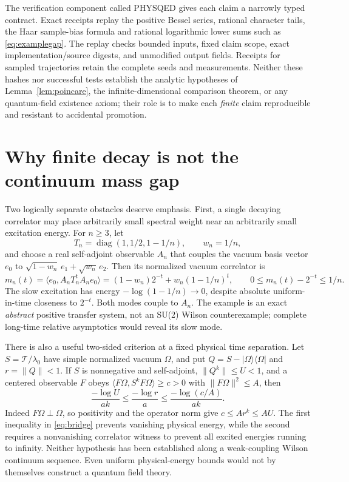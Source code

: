 \documentclass[11pt,a4paper]{article}
\numberwithin{equation}{section}
\begin{document}
The verification component called PHYSQED gives each
claim a narrowly typed contract. Exact receipts replay
the positive Bessel series, rational character tails,
the Haar sample-bias formula and rational logarithmic
lower sums such as \eqref{eq:examplegap}. The replay
checks bounded inputs, fixed claim scope, exact
implementation/source digests, and unmodified output
fields. Receipts for sampled trajectories retain the
complete seeds and measurements. Neither these hashes
nor successful tests establish the analytic hypotheses
of Lemma~\ref{lem:poincare}, the infinite-dimensional
comparison theorem, or any quantum-field existence
axiom; their role is to make each \emph{finite} claim
reproducible and resistant to accidental promotion.

\section{Why finite decay is not the continuum mass gap}
\label{sec:limits}

Two logically separate obstacles deserve emphasis.
First, a single decaying correlator may place
arbitrarily small spectral weight near an arbitrarily
small excitation energy. For \(n\geq3\), let
\[
 T_n=\operatorname{diag}(1,1/2,1-1/n),\qquad
 w_n=1/n,
\]
and choose a real self-adjoint observable \(A_n\)
that couples the vacuum basis vector \(e_0\) to
\(\sqrt{1-w_n}\,e_1+\sqrt{w_n}\,e_2\).
Then its normalized vacuum correlator is
\begin{equation}
 m_n(t)=\langle e_0,A_nT_n^tA_ne_0\rangle
   =(1-w_n)2^{-t}+w_n(1-1/n)^t, \qquad
 0\leq m_n(t)-2^{-t}\leq1/n.                    \label{eq:counter}
\end{equation}
The slow excitation has energy
\(-\log(1-1/n)\to0\), despite absolute
uniform-in-time closeness to \(2^{-t}\).
Both modes couple to \(A_n\). The example is
an exact \emph{abstract} positive transfer system,
not an SU(2) Wilson counterexample; complete
long-time relative asymptotics would reveal its
slow mode.

There is also a useful two-sided criterion at a fixed
physical time separation. Let \(S=\mathcal T/\lambda_0\)
have simple normalized vacuum \(\Omega\), and put
\(Q=S-|\Omega\rangle\langle\Omega|\) and
\(r=\|Q\|<1\). If \(S\) is nonnegative and
self-adjoint, \(\|Q^k\|\leq U<1\), and a centered
observable \(F\) obeys
\(\langle F\Omega,S^kF\Omega\rangle\geq c>0\)
with \(\|F\Omega\|^2\leq A\), then
\begin{equation}
 \frac{-\log U}{ak}\leq\frac{-\log r}{a}
              \leq\frac{-\log(c/A)}{ak}.       \label{eq:bridge}
\end{equation}
Indeed \(F\Omega\perp\Omega\), so positivity and
the operator norm give \(c\leq Ar^k\leq AU\).
The first inequality in \eqref{eq:bridge} prevents
vanishing physical energy, while the second requires
a nonvanishing correlator witness to prevent all
excited energies running to infinity. Neither hypothesis
has been established along a weak-coupling Wilson
continuum sequence. Even uniform physical-energy bounds
would not by themselves construct a quantum field theory.
\end{document}
